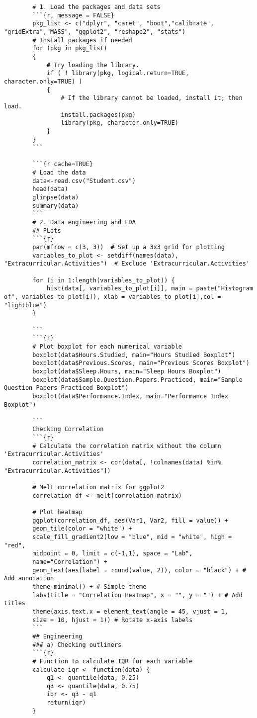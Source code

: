 \documentclass[12pt]{article}
\begin{document}
	\begin{lstlisting}
		# 1. Load the packages and data sets
		```{r, message = FALSE}
		pkg_list <- c("dplyr", "caret", "boot","calibrate", "gridExtra","MASS", "ggplot2", "reshape2", "stats") 
		# Install packages if needed
		for (pkg in pkg_list)
		{
			# Try loading the library.
			if ( ! library(pkg, logical.return=TRUE, character.only=TRUE) )
			{
				# If the library cannot be loaded, install it; then load.
				install.packages(pkg)
				library(pkg, character.only=TRUE)
			}
		}
		```
		
		```{r cache=TRUE}
		# Load the data 
		data<-read.csv("Student.csv")
		head(data)
		glimpse(data)
		summary(data)
		```
		# 2. Data engineering and EDA
		## PLots
		```{r}
		par(mfrow = c(3, 3))  # Set up a 3x3 grid for plotting
		variables_to_plot <- setdiff(names(data), "Extracurricular.Activities")  # Exclude 'Extracurricular.Activities'
		
		for (i in 1:length(variables_to_plot)) {
			hist(data[, variables_to_plot[i]], main = paste("Histogram of", variables_to_plot[i]), xlab = variables_to_plot[i],col = "lightblue")
		}
		
		```
		```{r}
		# Plot boxplot for each numerical variable
		boxplot(data$Hours.Studied, main="Hours Studied Boxplot")
		boxplot(data$Previous.Scores, main="Previous Scores Boxplot")
		boxplot(data$Sleep.Hours, main="Sleep Hours Boxplot")
		boxplot(data$Sample.Question.Papers.Practiced, main="Sample Question Papers Practiced Boxplot")
		boxplot(data$Performance.Index, main="Performance Index Boxplot")
		
		```
		Checking Correlation 
		```{r}
		# Calculate the correlation matrix without the column 'Extracurricular.Activities'
		correlation_matrix <- cor(data[, !colnames(data) %in% "Extracurricular.Activities"])
		
		# Melt correlation matrix for ggplot2
		correlation_df <- melt(correlation_matrix)
		
		# Plot heatmap
		ggplot(correlation_df, aes(Var1, Var2, fill = value)) +
		geom_tile(color = "white") +
		scale_fill_gradient2(low = "blue", mid = "white", high = "red", 
		midpoint = 0, limit = c(-1,1), space = "Lab", 
		name="Correlation") +
		geom_text(aes(label = round(value, 2)), color = "black") + # Add annotation
		theme_minimal() + # Simple theme
		labs(title = "Correlation Heatmap", x = "", y = "") + # Add titles
		theme(axis.text.x = element_text(angle = 45, vjust = 1, 
		size = 10, hjust = 1)) # Rotate x-axis labels
		```
		## Engineering
		### a) Checking outliners
		```{r}
		# Function to calculate IQR for each variable
		calculate_iqr <- function(data) {
			q1 <- quantile(data, 0.25)
			q3 <- quantile(data, 0.75)
			iqr <- q3 - q1
			return(iqr)
		}
		

\end{lstlisting}
\end{document}
